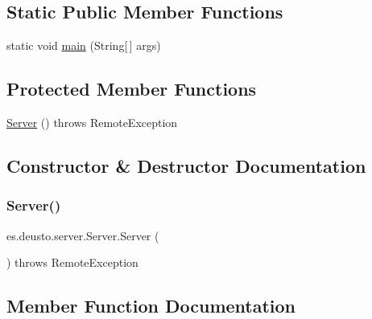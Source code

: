 \subsection*{Static Public Member Functions}
\begin{DoxyCompactItemize}
\item 
static void \mbox{\hyperlink{classes_1_1deusto_1_1server_1_1_server_a750bb0d7dbd89246a3602f2e20d03fb5}{main}} (String\mbox{[}$\,$\mbox{]} args)
\end{DoxyCompactItemize}
\subsection*{Protected Member Functions}
\begin{DoxyCompactItemize}
\item 
\mbox{\hyperlink{classes_1_1deusto_1_1server_1_1_server_a84f78162a65dd737f224eb2f94c43023}{Server}} ()  throws Remote\+Exception 
\end{DoxyCompactItemize}


\subsection{Constructor \& Destructor Documentation}
\mbox{\label{classes_1_1deusto_1_1server_1_1_server_a84f78162a65dd737f224eb2f94c43023}} 
\subsubsection{\texorpdfstring{Server()}{Server()}}
{\footnotesize\ttfamily es.\+deusto.\+server.\+Server.\+Server (\begin{DoxyParamCaption}{ }\end{DoxyParamCaption}) throws Remote\+Exception\hspace{0.3cm}{\ttfamily [protected]}}



\subsection{Member Function Documentation}
\mbox{\label{classes_1_1deusto_1_1server_1_1_server_ab38b8a38462608f1537cd7666e8ce0db}} 

